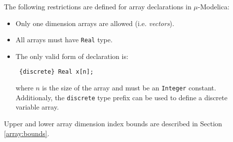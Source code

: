 \documentclass[11pt,a4paper,notitlepage]{report}
\begin{document}
The following restrictions are defined for array declarations in $\mu$-Modelica:

\begin{itemize}
\item Only one dimension arrays are allowed (i.e. \emph{vectors}).
\item All arrays must have \verb"Real" type.
\item The only valid form of declaration is:
 
 \verb" {discrete} Real x[n];"

where $n$ is the size of the array and must be an \verb"Integer" constant. Additionaly, the \verb"discrete" type prefix can be used to define a discrete variable array.
\end{itemize}

Upper and lower array dimension index bounds are described in Section \ref{array:bounds}.
\end{document}
